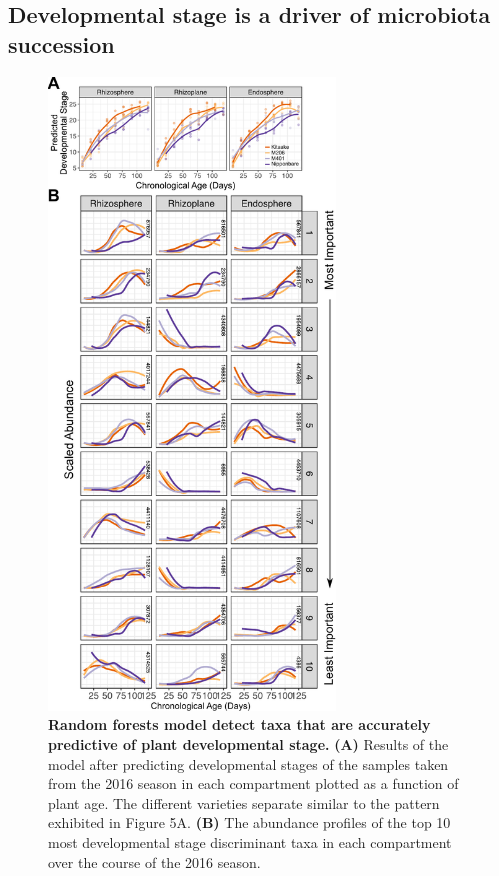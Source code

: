 \subsection{Developmental stage is a driver of microbiota succession}
\begin{figure}[tbh]
\centering
\includegraphics[width=3in]{Figures/figure3_6}
\caption[Figure 4.6]{\textbf{Random forests model detect taxa that are accurately predictive of plant developmental stage.} \textbf{(A)} Results of the model after predicting developmental stages of the samples taken from the 2016 season in each compartment plotted as a function of plant age. The different varieties separate similar to the pattern exhibited in Figure 5A. \textbf{(B)} The abundance profiles of the top 10 most developmental stage discriminant taxa in each compartment over the course of the 2016 season.}
\label{Figure 4.6}
\end{figure}

